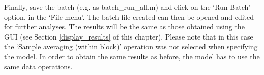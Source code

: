 Finally, save the batch (e.g. as batch\_run\_all.m) and click on the `Run Batch' option, in the `File menu'. The batch file created can then be opened and edited for further analyses. The results will be the same as those obtained using the GUI (see Section \ref{display_results}  of this chapter). Please note that in this case the `Sample averaging (within block)' operation was not selected when specifying the model. In order to obtain the same results as before, the model has to use the same data operations.
